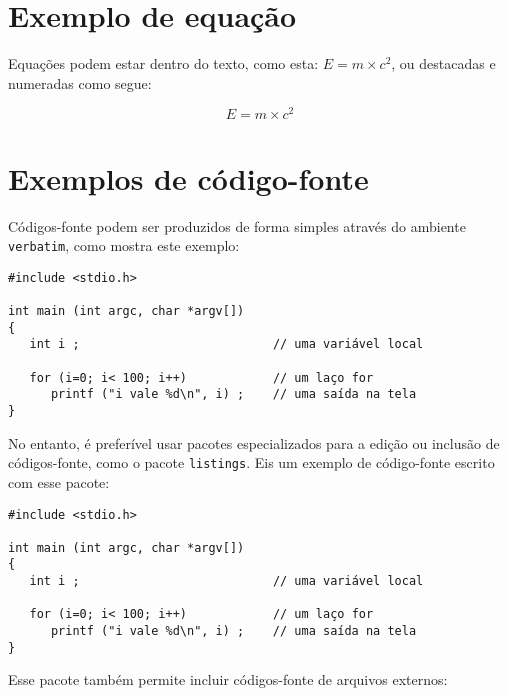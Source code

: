 \documentclass [12pt,oneside] {article}
\begin{document}

\section{Exemplo de equação}

Equações podem estar dentro do texto, como esta: $E=m\times c^2$, ou destacadas e numeradas como segue:

\begin{equation}
E = m \times c^2
\end{equation}


\section{Exemplos de código-fonte}

Códigos-fonte podem ser produzidos de forma simples através do ambiente \texttt{verbatim}, como mostra este exemplo:

\begin{footnotesize}
\begin{verbatim}
#include <stdio.h>

int main (int argc, char *argv[])
{
   int i ;                           // uma variável local

   for (i=0; i< 100; i++)            // um laço for
      printf ("i vale %d\n", i) ;    // uma saída na tela
}
\end{verbatim}
\end{footnotesize}

No entanto, é preferível usar pacotes especializados para a edição ou inclusão de códigos-fonte, como o pacote \texttt{listings}. Eis um exemplo de código-fonte escrito com esse pacote:

\begin{lstlisting}
#include <stdio.h>

int main (int argc, char *argv[])
{
   int i ;                           // uma variável local

   for (i=0; i< 100; i++)            // um laço for
      printf ("i vale %d\n", i) ;    // uma saída na tela
}
\end{lstlisting}

Esse pacote também permite incluir códigos-fonte de arquivos externos:


\end{document}
